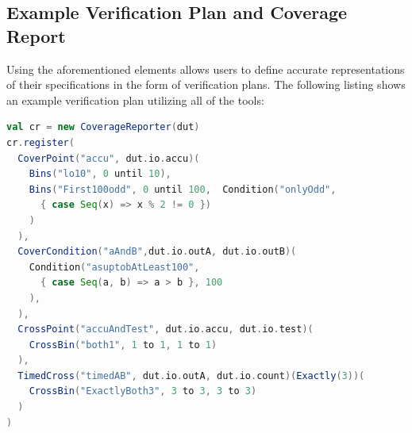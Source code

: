 \documentclass[conference]{IEEEtran}
\begin{document}
\subsection{Example Verification Plan and Coverage Report}%
Using the aforementioned elements allows users to define accurate representations of their specifications in the form of verification plans. The following listing shows an example verification plan utilizing all of the tools:
\begin{lstlisting}[language=scala]
val cr = new CoverageReporter(dut)
cr.register(
  CoverPoint("accu", dut.io.accu)(
    Bins("lo10", 0 until 10),
    Bins("First100odd", 0 until 100,  Condition("onlyOdd", 
      { case Seq(x) => x % 2 != 0 })
    )
  ),
  CoverCondition("aAndB",dut.io.outA, dut.io.outB)(
    Condition("asuptobAtLeast100", 
      { case Seq(a, b) => a > b }, 100
    ),
  ),
  CrossPoint("accuAndTest", dut.io.accu, dut.io.test)(
    CrossBin("both1", 1 to 1, 1 to 1)
  ),
  TimedCross("timedAB", dut.io.outA, dut.io.count)(Exactly(3))(
    CrossBin("ExactlyBoth3", 3 to 3, 3 to 3)
  ) 
)
\end{lstlisting}
\end{document}
